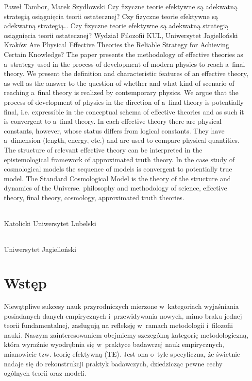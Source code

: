 \begin{artplenv2auth}{Paweł Tambor, Marek Szydłowski}
	{Czy fizyczne teorie efektywne są adekwatną strategią osiągnięcia teorii ostatecznej?}
	{Czy fizyczne teorie efektywne są adekwatną strategią\ldots}
	{Czy fizyczne teorie efektywne są adekwatną strategią osiągnięcia teorii ostatecznej?}
	{Wydział Filozofii KUL, Uniwersytet Jagielloński Kraków}
	{Are Physical Effective Theories the Reliable Strategy for Achieving Certain Knowledge?}
	{The paper presents the methodology of effective theories as a~strategy used in the process of development of modern physics to reach a~final theory. We present the definition and characteristic features of an effective theory, as well as the answer to the question of whether and what kind of scenario of reaching a~final theory is realized by contemporary physics. We argue that the process of development of physics in the direction of a~final theory is potentially final, i.e. expressible in the conceptual schema of effective theories and as such it is convergent to a~final theory. In each effective theory there are physical constants, however, whose status differs from logical constants. They have a~dimension (length, energy, etc.) and are used to compare physical quantities. The structure of relevant effective theory can be interpreted in the epistemological framework of approximated truth theory. In the case study of cosmological models the sequence of models is convergent to potentially true model. The Standard Cosmological Model is the theory of the structure and dynamics of the Universe.}
	{philosophy and methodology of science, effective theory, final theory, cosmology, approximated truth theories.}
	{%
			{\flushright{}\\\subsubsectit\small{Katolicki Uniwersytet Lubelski}\par}%
			{\flushright{}\\\subsubsectit\small{Uniwersytet Jagielloński}\par}%
		}


\section{Wstęp}
\lettrine[loversize=0.13,lines=2,lraise=-0.04,nindent=0em,findent=0.2pt]%
{N}{}iewątpliwe sukcesy nauk przyrodniczych mierzone w~kategoriach wyjaśniania posiadanych danych empirycznych i~przewidywania nowych, mimo braku jednej teorii fundamentalnej, zasługują na refleksję w~ramach metodologii i~filozofii nauki. Naszym zainteresowaniem obejmiemy szczególną kategorię metodologiczną, która wyraźnie wyodrębnia się w~praktyce badawczej nauk empirycznych, mianowicie tzw. teorię efektywną (TE). Jest ona o~tyle specyficzna, że świetnie nadaje się do rekonstrukcji praktyk badawczych, dziedzicząc pewne cechy ogólnych teorii oraz modeli.


\end{artplenv2auth}
